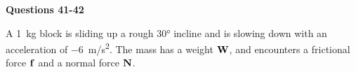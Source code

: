 \documentclass{../../oss-apphys}
\begin{document}
\begin{multicols}{2}
\begin{enumerate}[resume,leftmargin=18pt]
  \end{enumerate}
  \columnbreak
  
  \textbf{Questions 41-42}

  A \SI{1}{\kilo\gram} block is sliding up a rough \ang{30} incline and is
  slowing down with an acceleration of \SI{-6}{m/s^2}. The mass has a weight
  $\mathbf{W}$, and encounters a frictional force $\mathbf{f}$ and a normal force
  $\mathbf{N}$.
  \begin{center}
  \end{center}
  \begin{enumerate}[resume,leftmargin=18pt]
    

\end{enumerate}
\end{multicols}
\end{document}
